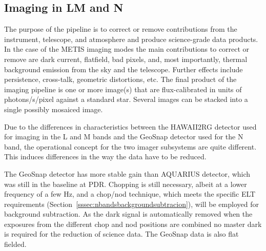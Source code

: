 \subsection{Imaging in LM and N}
\label{ssec:overview_lm_imaging}


The purpose of the pipeline is to correct or remove contributions from
the instrument, telescope, and atmosphere and produce science-grade
data products.  In the case of the METIS imaging modes the main
contributions to correct or remove are dark current, flatfield, bad
pixels, and, most importantly, thermal background emission from the
sky and the telescope. Further effects include persistence,
cross-talk, geometric distortions, etc. The final product of the
imaging pipeline is one or more image(s) that are flux-calibrated in units of
photons/s/pixel against a standard star.
Several images can be stacked into a single possibly mosaiced image.

Due to the differences in characteristics between the HAWAII2RG
detector used for imaging in the L and M bands and the GeoSnap
detector used for the N band, the operational concept for the two
imager subsystems are quite different. This induces differences in the
way the data have to be reduced.

The GeoSnap detector has more stable gain than AQUARIUS detector,
which was still in the baseline at PDR\@.  Chopping is still necessary, albeit
at a lower frequency of a few Hz, and a chop/nod technique, which meets the
specific ELT requirements (Section~\ref{sssec:nbandsbackgroundsubtracion}),
will be employed  for background subtraction.  As the dark
signal is automatically removed when the exposures from the different
chop and nod positions are combined no master dark is required for the
reduction of science data. The GeoSnap data is also flat fielded.

